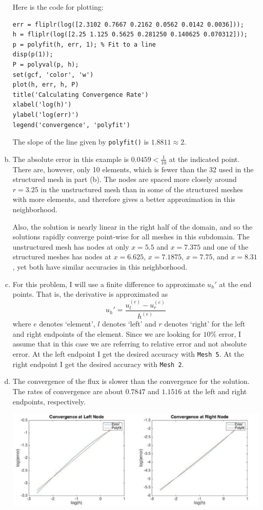 \documentclass[12pt]{article}
\begin{document}
\begin{enumerate}[(a)]
Here is the code for plotting:
\begin{lstlisting}
err = fliplr(log([2.3102 0.7667 0.2162 0.0562 0.0142 0.0036]));
h = fliplr(log([2.25 1.125 0.5625 0.281250 0.140625 0.070312]));
p = polyfit(h, err, 1); % Fit to a line
disp(p(1));
P = polyval(p, h);
set(gcf, 'color', 'w')
plot(h, err, h, P)
title('Calculating Convergence Rate')
xlabel('log(h)')
ylabel('log(err)')
legend('convergence', 'polyfit')
\end{lstlisting}

The slope of the line given by \texttt{polyfit()} is $1.8811 \approx 2$.	

\item The absolute error in this example is $0.0459 < \frac1{10}$ at the indicated point. There are, however, only 10 elements, which is fewer than the 32 used in the structured mesh in part (b). The nodes are spaced more closely around $r = 3.25$ in the unstructured mesh than in some of the structured meshes with more elements, and therefore gives a better approximation in this neighborhood. 

Also, the solution is nearly linear in the right half of the domain, and so the solutions rapidly converge  point-wise for all meshes in this subdomain.  The unstructured mesh has nodes at only $x = 5.5$ and $x = 7.375$ and one of the structured meshes has nodes at $x = 6.625$, $x = 7.1875$, $x =7.75$, and $x =8.31$, yet both have similar accuracies in this neighborhood.
\item For this problem, I will use a finite difference to approximate $u_h'$ at the end points. That is, the derivative is approximated as
\begin{equation*}
u_h' = \frac{u^{(e)}_l- u^{(e)}_r}{h^{(e)}}
\end{equation*}
where $e$ denotes `element', $l$ denotes `left' and $r$ denotes `right' for the left and right endpoints of the element. Since we are looking for $10\%$ error, I assume that in this case we are referring to relative error and not absolute error. At the left endpoint I get the desired accuracy with \texttt{Mesh 5}. At the right endpoint I get the desired accuracy with \texttt{Mesh 2}.
\item The convergence of the flux is slower than the convergence for the solution. The rates of convergence are about $0.7847$ and $1.1516$ at the left and right endpoints, respectively. 

\includegraphics[width=\textwidth]{convergence.png}
\end{enumerate}
\end{document}
